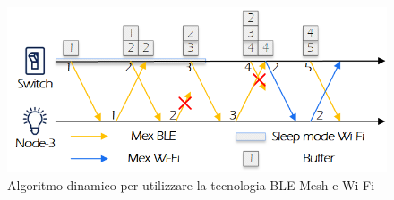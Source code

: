 \begin{figure}[!ht]
    \centering
    \includegraphics[width = \textwidth]{images/Algoritmo_dinamico.png}
    \caption{Algoritmo dinamico per utilizzare la tecnologia BLE Mesh e Wi-Fi}
    \label{fig:algoritmo dinamico}
\end{figure}


